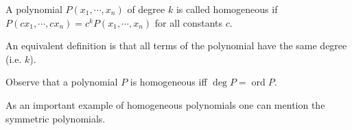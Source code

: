 \documentclass[12pt]{article}
\DeclareMathOperator{\ord}{ord}
\begin{document}
A polynomial $P(x_1, \cdots, x_n)$ of degree $k$ is called homogeneous if 
$P(cx_1, \cdots, cx_n) = c^{k}P(x_1, \cdots, x_n)$ for all constants $c$.

An equivalent definition is that all terms of the polynomial have the same degree (i.e. $k$).

Observe that a polynomial $P$ is homogeneous iff $\deg P = \ord P$.

As an important example of homogeneous polynomials one can mention the symmetric polynomials.
\end{document}
